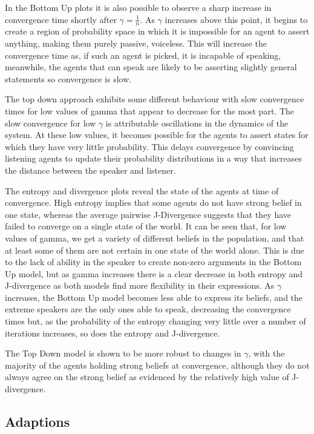 In the Bottom Up plots it is also possible to observe a sharp increase in convergence time shortly after $ \gamma = \frac{1}{n}$. As $\gamma$ increases above this point, it begins to create a region of probability space in which it is impossible for an agent to assert anything, making them purely passive, voiceless. This will increase the convergence time as, if such an agent is picked, it is incapable of speaking, meanwhile, the agents that can speak are likely to be asserting slightly general statements so convergence is slow. 

The top down approach exhibits some different behaviour with slow convergence times for low values of gamma that appear to decrease for the most part. The slow convergence for low $\gamma$ is attributable oscillations in the dynamics of the system. At these low values, it becomes possible for the agents to assert states for which they have very little probability. This delays convergence by convincing listening agents to update their probability distributions in a way that increases the distance between the speaker and listener. 

The entropy and divergence plots reveal the state of the agents at time of convergence. High entropy implies that some agents do not have strong belief in one state, whereas the average pairwise J-Divergence suggests that they have failed to converge on a single state of the world. It can be seen that, for low values of gamma, we get a variety of different beliefs in the population, and that at least some of them are not certain in one state of the world alone. This is due to the lack of ability in the speaker to create non-zero arguments in the Bottom Up model, but as gamma increases there is a clear decrease in both entropy and J-divergence as both models find more flexibility in their expressions. As $\gamma$ increases, the Bottom Up model becomes less able to express its beliefs, and the extreme speakers are the only ones able to speak, decreasing the convergence times but, as the probability of the entropy changing very little over a number of iterations increases, so does the entropy and J-divergence. 

The Top Down model is shown to be more robust to changes in $\gamma$, with the majority of the agents holding strong beliefs at convergence, although they do not always agree on the strong belief as evidenced by the relatively high value of J-divergence. 

\subsection{Adaptions}

